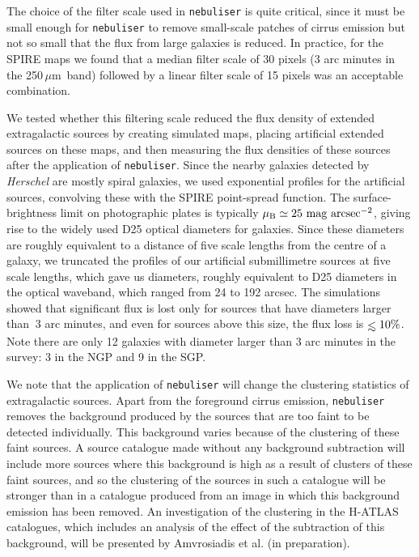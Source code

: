 \documentclass[a4paper,fleqn,usenatbib, twocolumn]{aastex61}
\def\lesssim{\mathrel{\hbox{\rlap{\hbox{\lower4pt\hbox{$\sim$}}}\hbox{$<$}}}}
\def\mic{\,$\mu $m}
\begin{document}
The choice of the filter scale used in {\tt nebuliser} is quite
critical, since it must be small enough for {\tt nebuliser} to remove
small-scale patches of cirrus emission but not so small that the flux
from large galaxies is reduced.  In practice, for the SPIRE maps we
found that a median filter scale of 30 pixels (3 arc minutes in the
250\mic\ band) followed by a linear filter scale of 15 pixels was an
acceptable combination.

We tested whether this filtering scale reduced the flux density of
extended extragalactic sources by creating simulated maps, placing
artificial extended sources on these maps, and then measuring the flux
densities of these sources after the application of {\tt nebuliser}.
Since the nearby galaxies detected by {\it Herschel} are mostly spiral
galaxies, we used exponential profiles for the artificial sources,
convolving these with the SPIRE point-spread function.  The
surface-brightness limit on photographic plates is typically
$\rm \mu_B \simeq 25\ mag\ arcsec^{-2}$, giving rise to the widely
used D25 optical diameters for galaxies.  Since these diameters are
roughly equivalent to a distance of five scale lengths from the centre
of a galaxy, we truncated the profiles of our artificial submillimetre
sources at five scale lengths, which gave us diameters, roughly
equivalent to D25 diameters in the optical waveband, which ranged from
24 to 192 arcsec.  The simulations showed that significant flux is
lost only for sources that have diameters larger than $~3$ arc
minutes, and even for sources above this size, the flux loss is
$\lesssim 10\%$. Note there are only 12 galaxies with diameter larger
than 3 arc minutes in the survey: 3 in the NGP and 9 in the SGP. 

We note that the application of {\tt nebuliser} will change the
clustering statistics of extragalactic sources.  Apart from the
foreground cirrus emission, {\tt nebuliser} removes the background
produced by the sources that are too faint to be detected
individually. This background varies because of the clustering of
these faint sources.  A source catalogue made without any background
subtraction will include more sources where this background is high as
a result of clusters of these faint sources, and so the clustering of
the sources in such a catalogue will be stronger than in a catalogue
produced from an image in which this background emission has been
removed. An investigation of the clustering in the H-ATLAS catalogues,
which includes an analysis of the effect of the subtraction of this
background, will be presented by Amvrosiadis et al. (in preparation).
\end{document}
